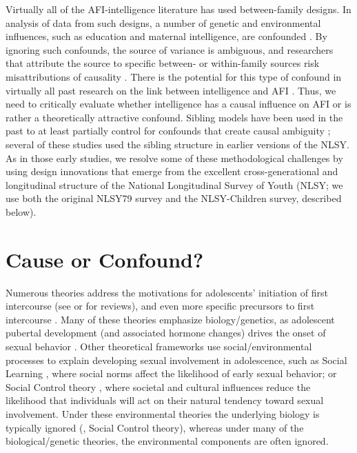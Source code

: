 Virtually all of the AFI-intelligence literature has used between-family designs. In analysis of data from such designs, a number of genetic and environmental influences, such as education and maternal intelligence, are confounded \citep{DOnofrio2013,harden2014genetic,Lahey2010,Rodgers2000}. By ignoring such confounds, the source of variance is ambiguous, and researchers that attribute the source to specific between- or within-family sources risk misattributions of causality \citep{Rowe1997,Rutter2007}. There is the potential for this type of confound in virtually all past research on the link between intelligence and AFI \citep{harden2011don,harden2014genetic,plomin2004intelligence,rodgers1999nature,rodgers1994df}. Thus, we need to critically evaluate whether intelligence has a causal influence on AFI or is rather a theoretically attractive confound. Sibling models have been used in the past to at least partially control for confounds that create causal ambiguity \citep[\eg][]{east1996younger,east1993sisters,geronimus1992socioeconomic,rodgers1990adolescent,rodgers1992sibling};  several of these studies used the sibling structure in earlier versions of the NLSY.  As in those early studies, we resolve some of these methodological challenges by using design innovations that emerge from the excellent cross-generational and longitudinal structure of the National Longitudinal Survey of Youth (NLSY; we use both the original NLSY79 survey and the NLSY-Children survey, described below).
%
\section{Cause or Confound?}
Numerous theories address the motivations for adolescents' initiation of first intercourse (see \citealp{Rodgers1996} or \citealp{Buhi2007} for reviews), and even more specific precursors to first intercourse \citep{Buhi2007,DOnofrio2010,kirby2002antecedents,miller1997timing,santelli1992risk}. Many of these theories emphasize biology/genetics, as adolescent pubertal development (and associated hormone changes) drives the onset of sexual behavior \citep{miller1999dopamine,udry1979age,udry1994nature}. Other theoretical frameworks use social/environmental processes to explain developing sexual involvement in adolescence, such as Social Learning \citep{diblasio1990adolescent,hogben1998using}, where social norms affect the likelihood of early sexual behavior; or Social Control theory \citep{hirschi2002causes}, where societal and cultural influences reduce the likelihood that individuals will act on their natural tendency toward sexual involvement. Under these environmental theories the underlying biology is typically ignored (\eg, Social Control theory), whereas under many of the biological/genetic theories, the environmental components are often ignored.

